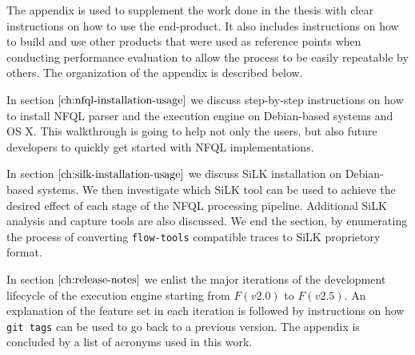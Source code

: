 The appendix is used to supplement the work done in the thesis with clear
instructions on how to use the end-product. It also includes instructions on
how to build and use other products that were used as reference points when
conducting performance evaluation to allow the process to be easily repeatable
by others. The organization of the appendix is described below.

\vspace{50pt}

In section $\ref{ch:nfql-installation-usage}$ we discuss step-by-step
instructions on how to install \ac{NFQL} parser and the execution engine on
Debian-based systems and OS X. This walkthrough is going to help not only the
users, but also future developers to quickly get started with \ac{NFQL}
implementations.

In section $\ref{ch:silk-installation-usage}$ we discuss SiLK installation on
Debian-based systems. We then investigate which SiLK tool can be used to
achieve the desired effect of each stage of the \ac{NFQL} processing pipeline.
Additional SiLK analysis and capture tools are also discussed. We end the
section, by enumerating the process of converting \texttt{flow-tools}
compatible traces to SiLK proprietory format.

In section $\ref{ch:release-notes}$ we enlist the major iterations of the
development lifecycle of the execution engine starting from $F(v2.0)$ to
$F(v2.5)$. An explanation of the feature set in each iteration is followed by
instructions on how \texttt{git tags} can be used to go back to a previous
version. The appendix is concluded by a list of acronyms used in this work.
